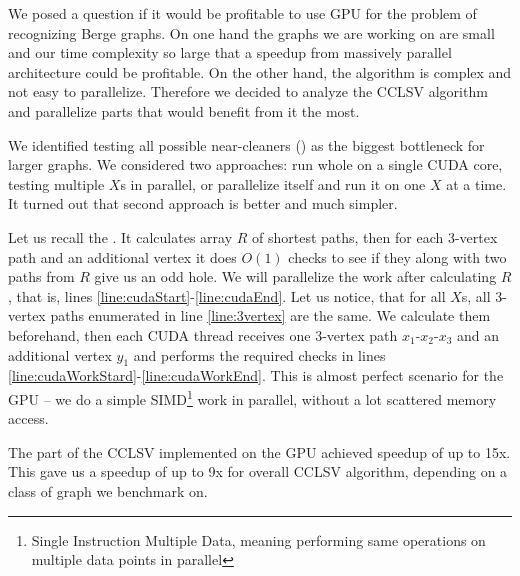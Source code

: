 We posed a question if it would be profitable to use GPU for the problem of recognizing Berge graphs. On one hand the graphs we are working on are small and our time complexity so large that a speedup from massively parallel architecture could be profitable. On the other hand, the algorithm is complex and not easy to parallelize. Therefore we decided to analyze the  CCLSV algorithm and parallelize parts that would benefit from it the most.




We identified testing all possible near-cleaners () as the biggest bottleneck for larger graphs. We considered two approaches: run whole  on a single CUDA core, testing multiple $X$s in parallel, or parallelize  itself and run it on one $X$ at a time. It turned out that second approach is better and much simpler.

Let us recall the . It calculates array $R$ of shortest paths, then for each 3-vertex path and an additional vertex it does $O(1)$ checks to see if they along with two paths from $R$ give us an odd hole. We will parallelize the work after calculating $R$, that is, lines \ref{line:cudaStart}-\ref{line:cudaEnd}. Let us notice, that for all $X$s, all 3-vertex paths enumerated in line \ref{line:3vertex} are the same. We calculate them beforehand, then each CUDA thread receives one 3-vertex path $x_1$-$x_2$-$x_3$ and an additional vertex $y_1$ and performs the required checks in lines \ref{line:cudaWorkStard}-\ref{line:cudaWorkEnd}. This is almost perfect scenario for the GPU -- we do a simple SIMD\footnote{Single Instruction Multiple Data, meaning performing same operations on multiple data points in parallel} work in parallel, without a lot scattered memory access.

The part of the CCLSV implemented on the GPU achieved speedup of up to 15x. This gave us a speedup of up to 9x for overall CCLSV algorithm, depending on a class of graph we benchmark on.

